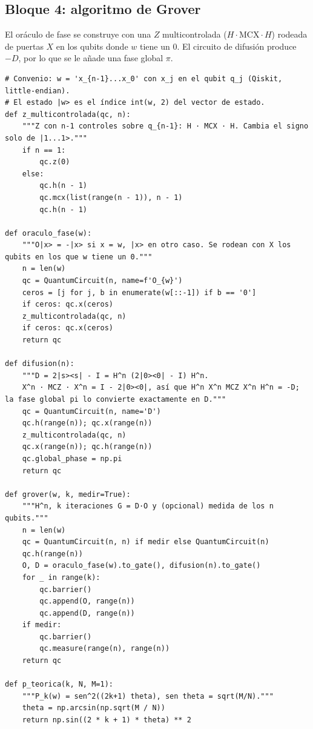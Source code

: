 \subsection{Bloque 4: algoritmo de Grover}

El oráculo de fase se construye con una $Z$ multicontrolada ($H\cdot\mathrm{MCX}\cdot H$) rodeada de puertas $X$ en los qubits donde $w$ tiene un $0$. El circuito de difusión produce $-D$, por lo que se le añade una fase global $\pi$.

\begin{lstlisting}[caption={Oráculo de fase, operador de difusión, circuito de Grover y probabilidad teórica $P_k$.},label={lst:b4_grover}]
# Convenio: w = 'x_{n-1}...x_0' con x_j en el qubit q_j (Qiskit, little-endian).
# El estado |w> es el índice int(w, 2) del vector de estado.
def z_multicontrolada(qc, n):
    """Z con n-1 controles sobre q_{n-1}: H · MCX · H. Cambia el signo solo de |1...1>."""
    if n == 1:
        qc.z(0)
    else:
        qc.h(n - 1)
        qc.mcx(list(range(n - 1)), n - 1)
        qc.h(n - 1)

def oraculo_fase(w):
    """O|x> = -|x> si x = w, |x> en otro caso. Se rodean con X los qubits en los que w tiene un 0."""
    n = len(w)
    qc = QuantumCircuit(n, name=f'O_{w}')
    ceros = [j for j, b in enumerate(w[::-1]) if b == '0']
    if ceros: qc.x(ceros)
    z_multicontrolada(qc, n)
    if ceros: qc.x(ceros)
    return qc

def difusion(n):
    """D = 2|s><s| - I = H^n (2|0><0| - I) H^n.
    X^n · MCZ · X^n = I - 2|0><0|, así que H^n X^n MCZ X^n H^n = -D; la fase global pi lo convierte exactamente en D."""
    qc = QuantumCircuit(n, name='D')
    qc.h(range(n)); qc.x(range(n))
    z_multicontrolada(qc, n)
    qc.x(range(n)); qc.h(range(n))
    qc.global_phase = np.pi
    return qc

def grover(w, k, medir=True):
    """H^n, k iteraciones G = D·O y (opcional) medida de los n qubits."""
    n = len(w)
    qc = QuantumCircuit(n, n) if medir else QuantumCircuit(n)
    qc.h(range(n))
    O, D = oraculo_fase(w).to_gate(), difusion(n).to_gate()
    for _ in range(k):
        qc.barrier()
        qc.append(O, range(n))
        qc.append(D, range(n))
    if medir:
        qc.barrier()
        qc.measure(range(n), range(n))
    return qc

def p_teorica(k, N, M=1):
    """P_k(w) = sen^2((2k+1) theta), sen theta = sqrt(M/N)."""
    theta = np.arcsin(np.sqrt(M / N))
    return np.sin((2 * k + 1) * theta) ** 2
\end{lstlisting}

